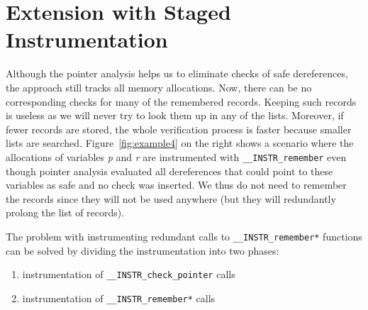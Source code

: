 \section{Extension with Staged Instrumentation}\label{sec:staged}
%
Although the pointer analysis helps us to eliminate checks of safe
dereferences, the approach still tracks all memory allocations.
Now, there can be no corresponding checks for many of the remembered records.
Keeping such records is useless as we will never try to look them up in any of the lists.
Moreover, if fewer records are stored, the whole verification process is faster
because smaller lists are searched.
Figure~\ref{fig:example4} on the right shows a scenario where the
allocations of variables \emph{p} and \emph{r} are instrumented with
\texttt{\_\_INSTR\_remember} even though pointer analysis evaluated
all dereferences that could point to these variables as safe and no
check was inserted.  We thus do not need to remember the records since
they will not be used anywhere (but they will redundantly prolong the
list of records).

The problem with instrumenting redundant calls to \texttt{\_\_INSTR\_remember*}
functions can be solved by dividing the instrumentation into two phases:
\begin{enumerate}
  \item instrumentation of \texttt{\_\_INSTR\_check\_pointer} calls
  \item instrumentation of \texttt{\_\_INSTR\_remember*} calls
\end{enumerate}

